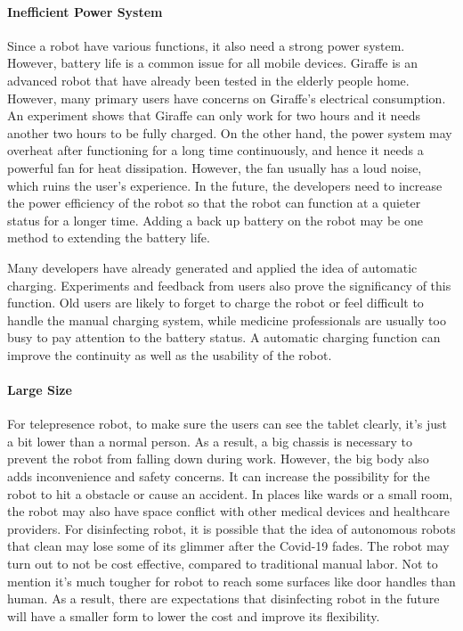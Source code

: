 \documentclass[a4paper]{article}
\begin{document}
\paragraph{Inefficient Power System}
    Since a robot have various functions, it also need a strong power system. However, battery life is a common issue for all mobile devices. Giraffe is an advanced robot that have already been tested in the elderly people home. However, many primary users have concerns on Giraffe's electrical consumption\cite{24}. An experiment shows that Giraffe can only work for two hours and it needs another two hours to be fully charged\cite{25}. On the other hand, the power system may overheat after functioning for a long time continuously, and hence it needs a powerful fan for heat dissipation. However, the fan usually has a loud noise, which ruins the user's experience. In the future, the developers need to increase the power efficiency of the robot so that the robot can function at a quieter status for a longer time. Adding a back up battery on the robot may be one method to extending the battery life\cite{26}. 

\par 
    Many developers have already generated and applied the idea of automatic charging. Experiments and feedback from users also prove the significancy of this function\cite{33}. Old users are likely to forget to charge the robot or feel difficult to handle the manual charging system, while medicine professionals are usually too busy to pay attention to the battery status. A automatic charging function can improve the continuity as well as the usability of the robot.

\paragraph{Large Size}
    For telepresence robot, to make sure the users can see the tablet clearly, it's just a bit lower than a normal person. As a result, a big chassis is necessary to prevent the robot from falling down during work. However, the big body also adds inconvenience and safety concerns\cite{27}. It can increase the possibility for the robot to hit a obstacle or cause an accident. In places like wards or a  small room, the robot may also have space conflict with other medical devices and healthcare providers.
For disinfecting robot, it is possible that the idea of autonomous robots that clean may lose some of its glimmer after the Covid-19 fades. The robot may turn out to not be cost effective, compared to traditional manual labor. Not to mention it's much tougher for robot to reach some surfaces like door handles than human. As a result, there are expectations that disinfecting robot in the future will have a smaller form to lower the cost and improve its flexibility.
\end{document}
